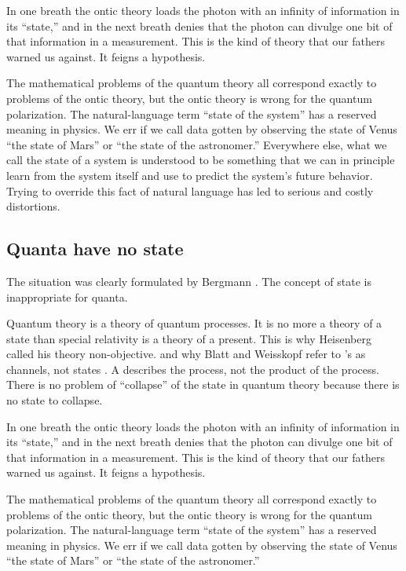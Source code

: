 \documentclass[a4paper,11pt]{article}
\begin{document}
In one breath the ontic theory loads 
the photon 
with an infinity of information
in its ``state,''
and in the next breath
denies that the photon can divulge one bit of that information in 
a measurement.
This is the kind of theory that our fathers warned us against.
It feigns a hypothesis.

The  mathematical problems of the quantum theory
all correspond exactly to problems of the ontic theory,
but the ontic theory is wrong for the quantum polarization.
The natural-language term  ``state of the system'' 
has a reserved meaning in physics.
We err if we call  data 
gotten by observing the state of Venus
``the state of Mars''  or ``the state of the astronomer.''
Everywhere else,
what  we call the state of a system 
is understood to be something that we can 
in principle learn  from the system itself
and use to predict
the system's future behavior.
Trying to override  this fact of natural language has
led to serious and costly distortions.


\subsection{Quanta have no state}

The situation was  clearly  formulated  by  
Bergmann \cite{BERGMANN}.
The concept of state is inappropriate for quanta.

Quantum theory is 
a theory of quantum processes.
It is no more a theory of a state
 than special relativity is a theory of a  present.
This is why Heisenberg  called his theory non-objective.
and why  Blatt and Weisskopf
refer to \myHighlight{$\psi$}\coordHE{}'s as channels, not states \cite{BLATT}.
A \myHighlight{$\psi$}\coordHE{} describes the  process, 
not the product of the process.
There is no problem of ``collapse'' 
of the state in quantum theory
because there is no state to collapse.

In one breath the ontic theory loads 
the photon 
with an infinity of information
in its ``state,''
and in the next breath
denies that the photon can divulge one bit of that information in 
a measurement.
This is the kind of theory that our fathers warned us against.
It feigns a hypothesis.

The  mathematical problems of the quantum theory
all correspond exactly to problems of the ontic theory,
but the ontic theory is wrong for the quantum polarization.
The natural-language term  ``state of the system'' 
has a reserved meaning in physics.
We err if we call  data 
gotten by observing the state of Venus
``the state of Mars''  or ``the state of the astronomer.''
\end{document}
